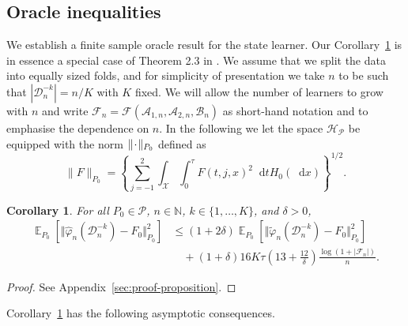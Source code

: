 \documentclass{statsoc}
\newtheorem{corollary}{Corollary}
\DeclareMathOperator{\E}{\mathbb{E}} %
\newcommand{\N}{\mathbb{N}}
\newcommand{\blank}{\makebox[1ex]{\textbf{$\cdot$}}}
\renewcommand{\phi}{\varphi}
\newcommand*\diff{\mathop{}\!\mathrm{d}}
\newcommand{\1}{\mathds{1}}
\newcommand{\data}{\ensuremath{\mathcal{D}}}
\begin{document}
\subsection{Oracle inequalities}
\label{sec:finite-sample-oracle}

We establish a finite sample oracle result for the state learner. Our
Corollary~\ref{cor:oracle-prop} is in essence a special case of
Theorem 2.3 in \citep{vaart2006oracle}.  We assume that we split the
data into equally sized folds, and for simplicity of presentation we
take \( n \) to be such that \( |\data_n^{-k}| = n/K \) with \( K \)
fixed. We will allow the number of learners to grow with \( n \) and
write
\( \mathcal{F}_n=\mathcal{F}(\mathcal{A}_{1,n}, \mathcal{A}_{2,n},
\mathcal{B}_n)\) as short-hand notation and to emphasise the
dependence on \( n \).
In the following we let the space \( \mathcal{H}_{\mathcal{P}} \) be equipped with the norm
\( \| \blank \|_{P_0} \) defined as
\begin{equation}
  \label{eq:norm}
  \| F \|_{P_0} = 
  \left\{
    \sum_{j=-1}^{2}\int_{\mathcal{X}} \int_0^{\tau} F(t, j, x)^2 \diff t H_0( \diff x)
  \right\}^{1/2}.
\end{equation}

\begin{corollary}
  \label{cor:oracle-prop}
  For all \(P_0\in\mathcal{P}\), \( n \in \N \), \( k \in \{1, \dots, K\} \),
  and $\delta>0$,
  \begin{align*}
    \E_{P_0}{\left[ \Vert \hat{\phi}_n(\data_n^{-k}) - F_0 \Vert_{P_0}^2 \right]}
    & \leq (1 + 2\delta)
      \E_{P_0}{\left[ \Vert \tilde{\phi}_n(\data_n^{-k}) - F_0 \Vert_{P_0}^2 \right]}
    \\
    & \quad
      + (1+ \delta) 16   K \tau
      \left(
      13 + \frac{12}{\delta}
      \right)
      \frac{\log(1 + |\mathcal{F}_n|)}{n}.
  \end{align*}
\end{corollary}
\begin{proof}
  See Appendix~\ref{sec:proof-proposition}.
\end{proof}

Corollary~\ref{cor:oracle-prop} has the following asymptotic consequences.
\end{document}
